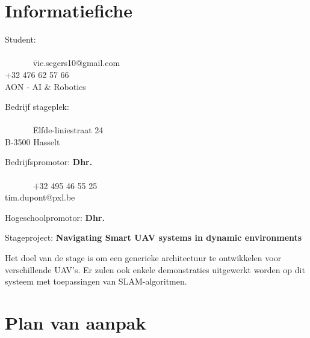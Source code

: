 \documentclass[a4paper]{article}
\begin{document}
  \titlepage{\stagebedrijf}{\student}{\bedrijfspromotor}{\hogeschoolpromotor}

  \begingroup
    \hypersetup{linkcolor=black}  %
    \tableofcontents
  \endgroup


  \section{Informatiefiche}
    \begin{tabbing}
      Student: \textbf{\student}\\
      \\
      ~~~~~~ \= vic.segers10@gmail.com\\
      \> +32 476 62 57 66\\
      \> AON - AI \& Robotics
    \end{tabbing}
    \begin{tabbing}
      Bedrijf stageplek: \textbf{\stagebedrijf}\\
      \\
      ~~~~~~ \= Elfde-liniestraat 24\\
      \> B-3500 Hasselt
    \end{tabbing}
    \begin{tabbing}
      Bedrijfspromotor: \textbf{Dhr. \bedrijfspromotor}\\
      \\
      ~~~~~~ \= +32 495 46 55 25\\
      \> tim.dupont@pxl.be
    \end{tabbing}
    \begin{tabbing}
      Hogeschoolpromotor: \textbf{Dhr. \hogeschoolpromotor}
    \end{tabbing}
    Stageproject: \textbf{Navigating Smart UAV systems in dynamic environments}
    \begin{addmargin}[5ex]{0pt}
      Het doel van de stage is om een generieke architectuur te ontwikkelen voor verschillende UAV's.
      Er zulen ook enkele demonstraties uitgewerkt worden op dit systeem met toepassingen van SLAM-algoritmen.
    \end{addmargin}

  \section{Plan van aanpak}
\end{document}

